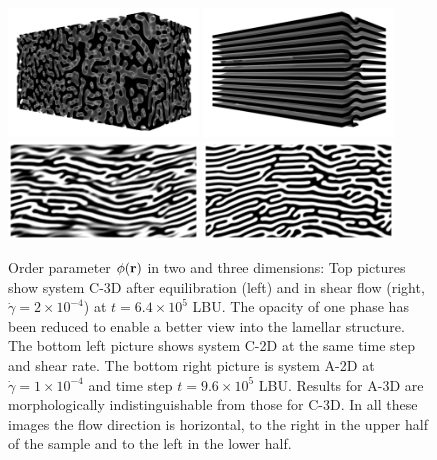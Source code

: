 \documentclass[8.5pt,twoside,twocolumn]{article}
\newcommand{\e}[1]{\times10^{#1}}
\begin{document}
{
\begin{figure}[htp!]
\centering
\includegraphics[angle=0,width=0.45\textwidth]{phi_run1002_320k.png}
\includegraphics[angle=0,width=0.45\textwidth]{phi_run1002_640k.png}
\includegraphics[angle=0,width=0.45\textwidth]{phi_run1001_640k.png}
\includegraphics[angle=0,width=0.45\textwidth]{phi_run1003_960k.png}
\caption{Order parameter $\phi({\bf r})$ in two and three dimensions: Top pictures show system C-3D after equilibration (left) and in shear flow (right, $\dot{\gamma}=2\times10^{-4}$) at $t=6.4\e{5}$ LBU. The opacity of one phase has been reduced to enable a better view into the lamellar structure. The bottom left picture shows system C-2D at the same time step and shear rate. The bottom right picture is system A-2D at $\dot{\gamma}=1\times10^{-4}$ and time step $t=9.6\e{5}$ LBU. Results for A-3D are morphologically indistinguishable from those for C-3D. In all these images the flow direction is horizontal, to the right in the upper half of the sample and to the left in the lower half.} 
\label{fig10}
\end{figure}
}
\end{document}
